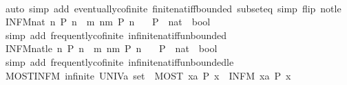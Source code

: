 \begin{isabellebody}
%
\isadelimproof
\ \ %
\endisadelimproof
%
\isatagproof
{}\isamarkupfalse%
\ {\isacharparenleft}auto\ simp\ add{\isacharcolon}\ eventually{\isacharunderscore}cofinite\ finite{\isacharunderscore}nat{\isacharunderscore}iff{\isacharunderscore}bounded\ subset{\isacharunderscore}eq\ simp\ flip{\isacharcolon}\ not{\isacharunderscore}le{\isacharparenright}%
\endisatagproof
{\isafoldproof}%
%
\isadelimproof
\isanewline
%
\endisadelimproof
\isanewline
{}\isamarkupfalse%
\ INFM{\isacharunderscore}nat{\isacharcolon}\ {\isachardoublequoteopen}{\isacharparenleft}{\isasymexists}\isactrlsub {\isasyminfinity}n{\isachardot}\ P\ n{\isacharparenright}\ {\isasymlongleftrightarrow}\ {\isacharparenleft}{\isasymforall}m{\isachardot}\ {\isasymexists}n{\isachargreater}m{\isachardot}\ P\ n{\isacharparenright}{\isachardoublequoteclose}\isanewline
\ \ \ P\ {\isacharcolon}{\isacharcolon}\ {\isachardoublequoteopen}nat\ {\isasymRightarrow}\ bool{\isachardoublequoteclose}\isanewline
%
\isadelimproof
\ \ %
\endisadelimproof
%
\isatagproof
{}\isamarkupfalse%
\ {\isacharparenleft}simp\ add{\isacharcolon}\ frequently{\isacharunderscore}cofinite\ infinite{\isacharunderscore}nat{\isacharunderscore}iff{\isacharunderscore}unbounded{\isacharparenright}%
\endisatagproof
{\isafoldproof}%
%
\isadelimproof
\isanewline
%
\endisadelimproof
\isanewline
{}\isamarkupfalse%
\ INFM{\isacharunderscore}nat{\isacharunderscore}le{\isacharcolon}\ {\isachardoublequoteopen}{\isacharparenleft}{\isasymexists}\isactrlsub {\isasyminfinity}n{\isachardot}\ P\ n{\isacharparenright}\ {\isasymlongleftrightarrow}\ {\isacharparenleft}{\isasymforall}m{\isachardot}\ {\isasymexists}n{\isasymge}m{\isachardot}\ P\ n{\isacharparenright}{\isachardoublequoteclose}\isanewline
\ \ \ P\ {\isacharcolon}{\isacharcolon}\ {\isachardoublequoteopen}nat\ {\isasymRightarrow}\ bool{\isachardoublequoteclose}\isanewline
%
\isadelimproof
\ \ %
\endisadelimproof
%
\isatagproof
{}\isamarkupfalse%
\ {\isacharparenleft}simp\ add{\isacharcolon}\ frequently{\isacharunderscore}cofinite\ infinite{\isacharunderscore}nat{\isacharunderscore}iff{\isacharunderscore}unbounded{\isacharunderscore}le{\isacharparenright}%
\endisatagproof
{\isafoldproof}%
%
\isadelimproof
\isanewline
%
\endisadelimproof
\isanewline
{}\isamarkupfalse%
\ MOST{\isacharunderscore}INFM{\isacharcolon}\ {\isachardoublequoteopen}infinite\ {\isacharparenleft}UNIV{\isacharcolon}{\isacharcolon}{\isacharprime}a\ set{\isacharparenright}\ {\isasymLongrightarrow}\ MOST\ x{\isacharcolon}{\isacharcolon}{\isacharprime}a{\isachardot}\ P\ x\ {\isasymLongrightarrow}\ INFM\ x{\isacharcolon}{\isacharcolon}{\isacharprime}a{\isachardot}\ P\ x{\isachardoublequoteclose}\isanewline

\end{isabellebody}
